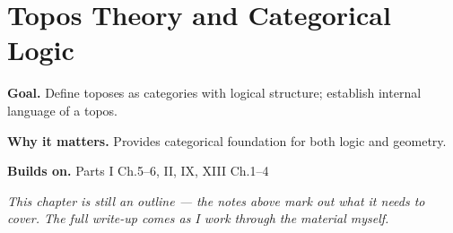 \chapter{Topos Theory and Categorical Logic}
\label{ch:13-category-theory-and-universal-structures-10}

\begin{chapterintro}
\textbf{Goal.} Define toposes as categories with logical structure; establish internal language of a topos.

\textbf{Why it matters.} Provides categorical foundation for both logic and geometry.

\textbf{Builds on.} Parts I Ch.5–6, II, IX, XIII Ch.1–4
\end{chapterintro}

\textit{This chapter is still an outline --- the notes above mark out what it needs to cover. The full write-up comes as I work through the material myself.}
